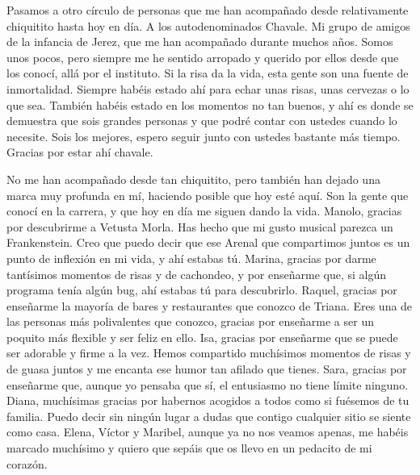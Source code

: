 \documentclass[
11pt, %
english, %
singlespacing, %
headsepline, %
chapterinoneline, %
]{MastersDoctoralThesis} %
\begin{document}
\begin{acknowledgements}
Pasamos a otro círculo de personas que me han acompañado desde relativamente chiquitito hasta hoy en día. A los autodenominados Chavale. Mi grupo de amigos de la infancia de Jerez, que me han acompañado durante muchos años. Somos unos pocos, pero siempre me he sentido arropado y querido por ellos desde que los conocí, allá por el instituto. Si la risa da la vida, esta gente son una fuente de inmortalidad. Siempre habéis estado ahí para echar unas risas, unas cervezas o lo que sea. También habéis estado en los momentos no tan buenos, y ahí es donde se demuestra que sois grandes personas y que podré contar con ustedes cuando lo necesite. Sois los mejores, espero seguir junto con ustedes bastante más tiempo. Gracias por estar ahí chavale. 

No me han acompañado desde tan chiquitito, pero también han dejado una marca muy profunda en mí, haciendo posible que hoy esté aquí. Son la gente que conocí en la carrera, y que hoy en día me siguen dando la vida. Manolo, gracias por descubrirme a Vetusta Morla. Has hecho que mi gusto musical parezca un Frankenstein. Creo que puedo decir que ese Arenal que compartimos juntos es un punto de inflexión en mi vida, y ahí estabas tú. Marina, gracias por darme tantísimos momentos de risas y de cachondeo, y por enseñarme que, si algún programa tenía algún bug, ahí estabas tú para descubrirlo. Raquel, gracias por enseñarme la mayoría de bares y restaurantes que conozco de Triana. Eres una de las personas más polivalentes que conozco, gracias por enseñarme a ser un poquito más flexible y ser feliz en ello. Isa, gracias por enseñarme que se puede ser adorable y firme a la vez. Hemos compartido muchísimos momentos de risas y de guasa juntos y me encanta ese humor tan afilado que tienes. Sara, gracias por enseñarme que, aunque yo pensaba que sí, el entusiasmo no tiene límite ninguno.  Diana, muchísimas gracias por habernos acogidos a todos como si fuésemos de tu familia. Puedo decir sin ningún lugar a dudas que contigo cualquier sitio se siente como casa. Elena, Víctor y Maribel, aunque ya no nos veamos apenas, me habéis marcado muchísimo y quiero que sepáis que os llevo en un pedacito de mi corazón. 


\end{acknowledgements}
\end{document}
